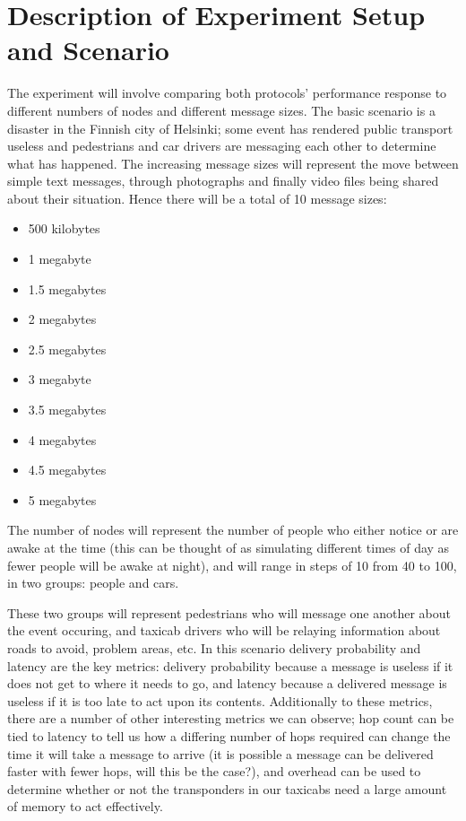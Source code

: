 \documentclass[12pt]{report}
\begin{document}
\section{Description of Experiment Setup and Scenario}

The experiment will involve comparing both protocols' performance response to different numbers of nodes and different message sizes.
The basic scenario is a disaster in the Finnish city of Helsinki; some event has rendered public transport useless and pedestrians and car drivers are messaging each other to determine what has happened.
The increasing message sizes will represent the move between simple text messages, through photographs and finally video files being shared about their situation.
Hence there will be a total of 10 message sizes:
\begin{itemize}
  \item 500 kilobytes
  \item 1 megabyte
  \item 1.5 megabytes
  \item 2 megabytes
  \item 2.5 megabytes
  \item 3 megabyte
  \item 3.5 megabytes
  \item 4 megabytes
  \item 4.5 megabytes
  \item 5 megabytes
\end{itemize}

The number of nodes will represent the number of people who either notice or are awake at the time (this can be thought of as simulating different times of day as fewer people will be awake at night), and will range in steps of 10 from 40 to 100, in two groups: people and cars.

\par

These two groups will represent pedestrians who will message one another about the event occuring, and taxicab drivers who will be relaying information about roads to avoid, problem areas, etc.
In this scenario delivery probability and latency are the key metrics: delivery probability because a message is useless if it does not get to where it needs to go, and latency because a delivered message is useless if it is too late to act upon its contents.
Additionally to these metrics, there are a number of other interesting metrics we can observe; hop count can be tied to latency to tell us how a differing number of hops required can change the time it will take a message to arrive (it is possible a message can be delivered faster with fewer hops, will this be the case?), and overhead can be used to determine whether or not the transponders in our taxicabs need a large amount of memory to act effectively.
\end{document}
